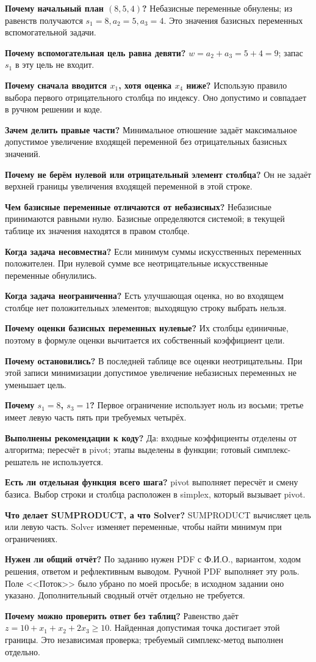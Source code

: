\documentclass[12pt,a4paper]{article}
\begin{document}
\textbf{Почему начальный план $(8,5,4)$?}
Небазисные переменные обнулены; из равенств получаются
$s_1=8,a_2=5,a_3=4$. Это значения базисных переменных вспомогательной задачи.

\textbf{Почему вспомогательная цель равна девяти?}
$w=a_2+a_3=5+4=9$; запас $s_1$ в эту цель не входит.

\textbf{Почему сначала вводится $x_1$, хотя оценка $x_4$ ниже?}
Использую правило выбора первого отрицательного столбца по индексу.
Оно допустимо и совпадает в ручном решении и коде.

\textbf{Зачем делить правые части?}
Минимальное отношение задаёт максимальное допустимое увеличение
входящей переменной без отрицательных базисных значений.

\textbf{Почему не берём нулевой или отрицательный элемент столбца?}
Он не задаёт верхней границы увеличения входящей переменной в этой строке.

\textbf{Чем базисные переменные отличаются от небазисных?}
Небазисные принимаются равными нулю. Базисные определяются системой;
в текущей таблице их значения находятся в правом столбце.

\textbf{Когда задача несовместна?}
Если минимум суммы искусственных переменных положителен.
При нулевой сумме все неотрицательные искусственные переменные обнулились.

\textbf{Когда задача неограниченна?}
Есть улучшающая оценка, но во входящем столбце нет положительных элементов;
выходящую строку выбрать нельзя.

\textbf{Почему оценки базисных переменных нулевые?}
Их столбцы единичные, поэтому в формуле оценки вычитается их собственный
коэффициент цели.

\textbf{Почему остановились?}
В последней таблице все оценки неотрицательны. При этой записи
минимизации допустимое увеличение небазисных переменных не уменьшает цель.

\textbf{Почему $s_1=8$, $s_3=1$?}
Первое ограничение использует ноль из восьми; третье имеет левую часть
пять при требуемых четырёх.

\textbf{Выполнены рекомендации к коду?}
Да: входные коэффициенты отделены от алгоритма; пересчёт в pivot;
этапы выделены в функции; готовый симплекс-решатель не используется.

\textbf{Есть ли отдельная функция всего шага?}
pivot выполняет пересчёт и смену базиса. Выбор строки и столбца расположен
в simplex, который вызывает pivot.

\textbf{Что делает SUMPRODUCT, а что Solver?}
SUMPRODUCT вычисляет цель или левую часть. Solver изменяет переменные,
чтобы найти минимум при ограничениях.

\textbf{Нужен ли общий отчёт?}
По заданию нужен PDF с Ф.И.О., вариантом, ходом решения, ответом
и рефлективным выводом. Ручной PDF выполняет эту роль.
Поле <<Поток>> было убрано по моей просьбе; в исходном задании оно указано.
Дополнительный сводный отчёт отдельно не требуется.

\textbf{Почему можно проверить ответ без таблиц?}
Равенство даёт $z=10+x_1+x_2+2x_3\ge10$.
Найденная допустимая точка достигает этой границы.
Это независимая проверка; требуемый симплекс-метод выполнен отдельно.
\end{document}
